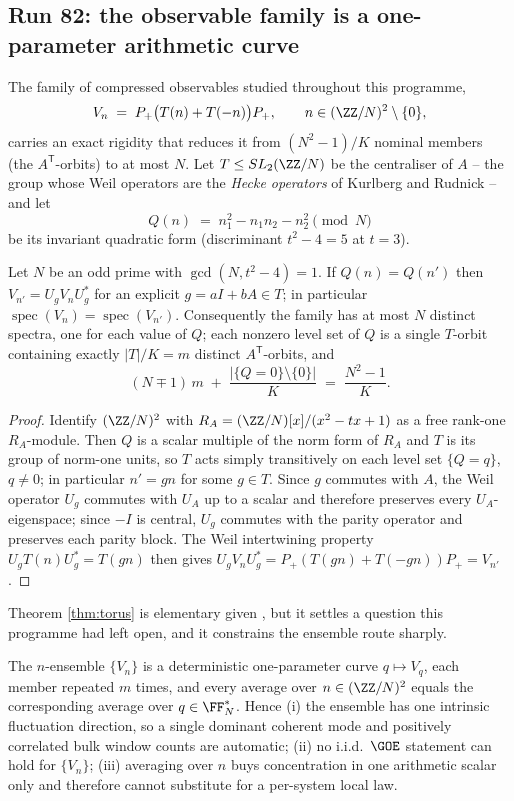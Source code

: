\subsection{Run 82: the observable family is a one-parameter arithmetic
curve}\label{sub:r82}

The family of compressed observables studied throughout this programme,
\[
  V_n \;=\; P_+\bigl(T(n)+T(-n)\bigr)P_+ ,
  \qquad n\in(\ZZ/N)^2\setminus\{0\},
\]
carries an exact rigidity that reduces it from $(N^2-1)/K$ nominal members
(the $A^{\mathsf T}$-orbits) to at most $N$.  Let $T\le SL_2(\ZZ/N)$ be the
centraliser of $A$ -- the group whose Weil operators are the \emph{Hecke
operators} of Kurlberg and Rudnick \cite{KR2000} -- and let
\[
  Q(n)\;=\;n_1^2-n_1n_2-n_2^2 \pmod N
\]
be its invariant quadratic form (discriminant $t^2-4=5$ at $t=3$).

\begin{theorem}\label{thm:torus}
Let $N$ be an odd prime with $\gcd(N,t^2-4)=1$.  If $Q(n)=Q(n')$ then
$V_{n'}=U_gV_nU_g^{*}$ for an explicit $g=aI+bA\in T$; in particular
$\operatorname{spec}(V_n)=\operatorname{spec}(V_{n'})$.  Consequently the
family has at most $N$ distinct spectra, one for each value of $Q$; each
nonzero level set of $Q$ is a single $T$-orbit containing exactly $|T|/K=m$
distinct $A^{\mathsf T}$-orbits, and
\[
  (N\mp1)\,m \;+\; \frac{|\{Q=0\}\setminus\{0\}|}{K}\;=\;\frac{N^2-1}{K}.
\]
\end{theorem}

\begin{proof}
Identify $(\ZZ/N)^2$ with $R_A=(\ZZ/N)[x]/(x^2-tx+1)$ as a free rank-one
$R_A$-module.  Then $Q$ is a scalar multiple of the norm form of $R_A$ and $T$
is its group of norm-one units, so $T$ acts simply transitively on each level
set $\{Q=q\}$, $q\neq0$; in particular $n'=gn$ for some $g\in T$.  Since $g$
commutes with $A$, the Weil operator $U_g$ commutes with $U_A$ up to a scalar
and therefore preserves every $U_A$-eigenspace; since $-I$ is central, $U_g$
commutes with the parity operator and preserves each parity block.  The Weil
intertwining property $U_gT(n)U_g^{*}=T(gn)$ then gives
$U_gV_nU_g^{*}=P_+(T(gn)+T(-gn))P_+=V_{n'}$.
\end{proof}

Theorem \ref{thm:torus} is elementary given \cite{KR2000}, but it settles a
question this programme had left open, and it constrains the ensemble route
sharply.

\begin{corollary}\label{cor:curve}
The $n$-ensemble $\{V_n\}$ is a deterministic one-parameter curve
$q\mapsto V_q$, each member repeated $m$ times, and every average over
$n\in(\ZZ/N)^2$ equals the corresponding average over $q\in\FF_N^{*}$.
Hence \textup{(i)} the ensemble has one intrinsic fluctuation direction, so a
single dominant coherent mode and positively correlated bulk window counts are
automatic; \textup{(ii)} no i.i.d.\ $\GOE$ statement can hold for $\{V_n\}$;
\textup{(iii)} averaging over $n$ buys concentration in one arithmetic scalar
only and therefore cannot substitute for a per-system local law.
\end{corollary}

